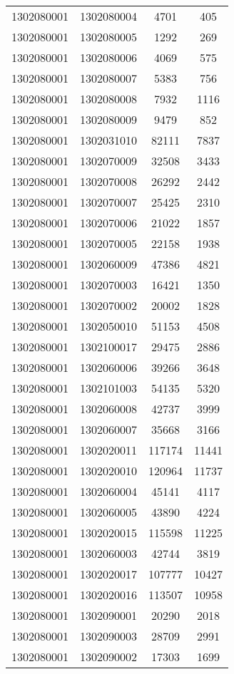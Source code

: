 \begin{longtable}[h]{llcc}
		1302080001 & 1302080004 & 4701 & 405\\
		1302080001 & 1302080005 & 1292 & 269\\
		1302080001 & 1302080006 & 4069 & 575\\
		1302080001 & 1302080007 & 5383 & 756\\
		1302080001 & 1302080008 & 7932 & 1116\\
		1302080001 & 1302080009 & 9479 & 852\\
		1302080001 & 1302031010 & 82111 & 7837\\
		1302080001 & 1302070009 & 32508 & 3433\\
		1302080001 & 1302070008 & 26292 & 2442\\
		1302080001 & 1302070007 & 25425 & 2310\\
		1302080001 & 1302070006 & 21022 & 1857\\
		1302080001 & 1302070005 & 22158 & 1938\\
		1302080001 & 1302060009 & 47386 & 4821\\
		1302080001 & 1302070003 & 16421 & 1350\\
		1302080001 & 1302070002 & 20002 & 1828\\
		1302080001 & 1302050010 & 51153 & 4508\\
		1302080001 & 1302100017 & 29475 & 2886\\
		1302080001 & 1302060006 & 39266 & 3648\\
		1302080001 & 1302101003 & 54135 & 5320\\
		1302080001 & 1302060008 & 42737 & 3999\\
		1302080001 & 1302060007 & 35668 & 3166\\
		1302080001 & 1302020011 & 117174 & 11441\\
		1302080001 & 1302020010 & 120964 & 11737\\
		1302080001 & 1302060004 & 45141 & 4117\\
		1302080001 & 1302060005 & 43890 & 4224\\
		1302080001 & 1302020015 & 115598 & 11225\\
		1302080001 & 1302060003 & 42744 & 3819\\
		1302080001 & 1302020017 & 107777 & 10427\\
		1302080001 & 1302020016 & 113507 & 10958\\
		1302080001 & 1302090001 & 20290 & 2018\\
		1302080001 & 1302090003 & 28709 & 2991\\
		1302080001 & 1302090002 & 17303 & 1699\\

\end{longtable}
